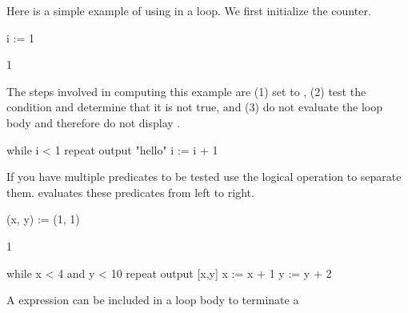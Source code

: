 {\begin{xtc}
\begin{xtccomment}
Here is a simple example of using  in a loop.
We first initialize the counter.
\end{xtccomment}
\begin{spadsrc}
i := 1 
\end{spadsrc}
\begin{TeXOutput}
\begin{fricasmath}{1}
1%
\end{fricasmath}
\end{TeXOutput}
\end{xtc}
\begin{xtc}
\begin{xtccomment}
The steps involved in computing this example are
(1) set  to , (2) test the condition  and
determine that it is not true, and (3) do not evaluate the
loop body and therefore do not display .
\end{xtccomment}
\begin{spadsrc}
while i < 1 repeat
  output "hello"
  i := i + 1
\end{spadsrc}
\end{xtc}
\begin{xtc}
\begin{xtccomment}
If you have multiple predicates to be tested use the
logical  operation to separate them.
\Language{} evaluates these predicates from left to right.
\end{xtccomment}
\begin{spadsrc}
(x, y) := (1, 1) 
\end{spadsrc}
\begin{TeXOutput}
\begin{fricasmath}{3}
1%
\end{fricasmath}
\end{TeXOutput}
\end{xtc}
\begin{xtc}
\begin{xtccomment}
\end{xtccomment}
\begin{spadsrc}
while x < 4 and y < 10 repeat
  output [x,y]
  x := x + 1
  y := y + 2
\end{spadsrc}
\end{xtc}
\begin{xtc}
\begin{xtccomment}
A  expression can be included in a loop body to terminate a

\end{xtccomment}
\end{xtc}}
